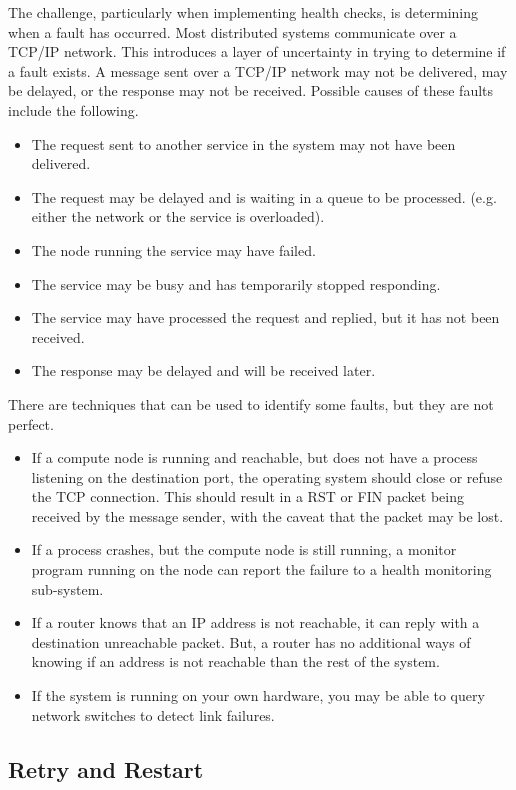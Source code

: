 The challenge, particularly when implementing health checks, is determining when a fault has occurred.
Most distributed systems communicate over a TCP/IP network.
This introduces a layer of uncertainty in trying to determine if a fault exists.
A message sent over a TCP/IP network may not be delivered, may be delayed, or the response may not be received.
Possible causes of these faults include the following.
\begin{itemize}
    \item The request sent to another service in the system may not have been delivered.
    \item The request may be delayed and is waiting in a queue to be processed. (e.g. either the network or the service is overloaded).
    \item The node running the service may have failed.
    \item The service may be busy and has temporarily stopped responding.
    \item The service may have processed the request and replied, but it has not been received.
    \item The response may be delayed and will be received later.
\end{itemize}

\noindent
There are techniques that can be used to identify some faults, but they are not perfect.
\begin{itemize}
    \item If a compute node is running and reachable, but does not have a process listening on the destination port, the operating system should close or refuse the TCP connection. This should result in a RST or FIN packet being received by the message sender, with the caveat that the packet may be lost.
    \item If a process crashes, but the compute node is still running, a monitor program running on the node can report the failure to a health monitoring sub-system.
    \item If a router knows that an IP address is not reachable, it can reply with a destination unreachable packet. But, a router has no additional ways of knowing if an address is not reachable than the rest of the system.
    \item If the system is running on your own hardware, you may be able to query network switches to detect link failures.
\end{itemize}

\subsection{Retry and Restart}

